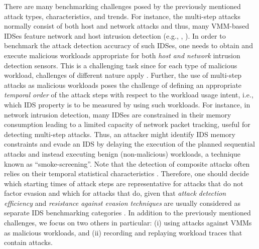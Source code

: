 There are many benchmarking challenges posed by the previously mentioned attack types, characteristics, and trends. For instance, the multi-step attacks normally consist of both host and network attacks and thus, many VMM-based IDSes feature network and host intrusion detection (e.g., \cite{lombardi:secure}, \cite{hai:vmfence}). In order to benchmark the attack detection accuracy of such IDSes, one needs to obtain and execute malicious workloads appropriate for both \emph{host and network} intrusion detection sensors. This is a challenging task since for each type of malicious workload, challenges of different nature apply \cite{mell:anoverview}. Further, the use of multi-step attacks as malicious workloads poses the challenge of defining an appropriate \emph{temporal order} of the attack steps with respect to the workload usage intent, i.e., which IDS property is to be measured by using such workloads. For instance, in network intrusion detection, many IDSes are constrained in their memory consumption leading to a limited capacity of network packet tracking, useful for detecting multi-step attacks. Thus, an attacker might identify IDS memory constraints and evade an IDS by delaying the execution of the planned sequential attacks and instead executing benign (non-malicious) workloads, a technique known as ``smoke-screening''. Note that the detection of composite attacks often relies on their temporal statistical characteristics \cite{wang:anovel}. Therefore, one should decide which starting times of attack steps are representative for attacks that do not factor evasion and which for attacks that do, given that \emph{attack detection efficiency} and \emph{resistance against evasion techniques} are usually considered as separate IDS benchmarking categories \cite{nsslabs:network}. In addition to the previously mentioned challenges, we focus on two others in particular: (i) using attacks against VMMs as malicious workloads, and (ii) recording and replaying workload traces that contain attacks. 

